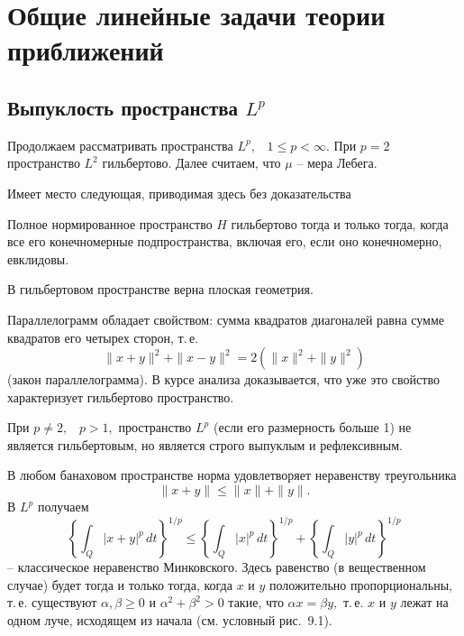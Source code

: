 

\chapter{Общие линейные задачи теории приближений}

\section{Выпуклость пространства $L^p$}

Продолжаем рассматривать пространства ${L^p},$~ $1\le p<\infty.$ При $p=2$ пространство
 ${L^2}$ гильбертово. Далее считаем, что $\mu$ -- мера
 Лебега.

Имеет место следующая, приводимая здесь без доказательства
 \begin{teo}    %
 Полное нормированное пространство {$H$ гильбертово} тогда и только тогда, когда все его
 конечномерные подпространства, включая его, если оно конечномерно,
 евклидовы.
 \end{teo}


 \begin{Corollary} %
 В гильбертовом пространстве верна плоская геометрия.
 \end{Corollary}

 \begin{Example} %
 Параллелограмм обладает свойством:
  сумма квадратов диагоналей равна сумме квадратов его четырех сторон,
  т.\,е.
 $$
 \|x+y\|^2+\|x-y\|^2=2(\|x\|^2+\|y\|^2)
 $$
 (закон параллелограмма). В курсе анализа
  доказывается, что уже это свойство характеризует гильбертово
  пространство.
 \end{Example}

 При $p\ne 2,$~ $p>1,$ пространство ${L^p}$ (если его размерность больше 1)
 не является гильбертовым,
 но является строго выпуклым и рефлексивным.

 В любом банаховом пространстве норма удовлетворяет  неравенству
 треугольника
 $$
 \|x+y\|\le \|x\|+\|y\|.
 $$
 В ${L^p}$ получаем
 $$
 \left\{ \int_Q {|x+y|}^p\, dt \right\}^{1/p} \le
 \left\{ \int_Q |x|^p\, dt \right\}^{1/p}+
 \left\{ \int_Q |y|^p\, dt \right\}^{1/p}
 $$
 -- классическое неравенство Минковского. Здесь
  равенство (в вещественном случае) будет тогда и только тогда, когда
 $x$ и $y$ положительно пропорциональны, т.\,е. существуют
 $\alpha,\beta \ge 0$ и $\alpha^2+\beta^2>0$ такие, что $\alpha
 x=\beta y,$ т.\,е. $x$ и $y$ лежат на одном луче, исходящем из начала
 (см. условный рис.~9.1).

